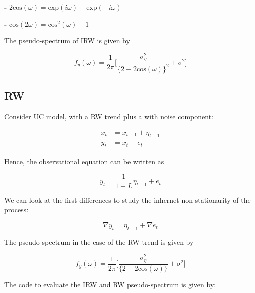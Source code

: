 \documentclass{article}\usepackage[]{graphicx}\usepackage[]{color}
\begin{document}
\textbf{-} $2\text{cos}(\omega) = \text{exp}(i\omega) +  \text{exp}(-i\omega) $

\textbf{-} $\text{cos}(2\omega) = \text{cos}^2(\omega) - 1 $

\vspace{0.3cm}

The pseudo-spectrum of IRW is given by



\begin{equation*}
f_y(\omega) = \dfrac{1}{2\pi} \Big[ \dfrac{\sigma^2_{\eta}}{\{2-2\text{cos}(\omega)\}^2} + \sigma^2\Big]
\end{equation*}



\subsection*{RW}
Consider UC model, with a RW trend plus a with noise component:

\begin{equation*}
\begin{split}
x_t &= x_{t-1} + \eta_{t-1} \\
y_t &= x_t + {e_t}
\end{split}
\end{equation*}

Hence, the observational equation can be written as

\begin{equation*}
\boxed{
y_t = \dfrac{1}{1-L}\eta_{t-1} + {e_t}
}
\end{equation*}

We can look at the first differences to study the inhernet non stationarity of the process:

\begin{equation*}
\nabla y_t = \eta_{t-1} + \nabla{e_t}
\end{equation*}

The pseudo-spectrum in the case of the RW trend is given by

\begin{equation*}
f_y(\omega) = \dfrac{1}{2\pi} \Big[ \dfrac{\sigma^2_{\eta}}{\{2-2\text{cos}(\omega)\}} + \sigma^2\Big]
\end{equation*}

\newpage

The code to evaluate the IRW and RW pseudo-spectrum is given by:
\end{document}
